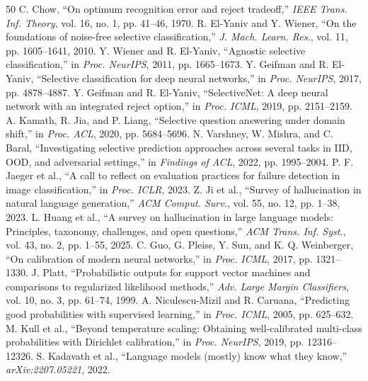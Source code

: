\documentclass[10pt,conference]{IEEEtran}
\begin{document}
\balance
\begin{thebibliography}{50}
 C. Chow, ``On optimum recognition error and reject tradeoff,'' \emph{IEEE Trans. Inf. Theory}, vol. 16, no. 1, pp. 41--46, 1970.
 R. El-Yaniv and Y. Wiener, ``On the foundations of noise-free selective classification,'' \emph{J. Mach. Learn. Res.}, vol. 11, pp. 1605--1641, 2010.
 Y. Wiener and R. El-Yaniv, ``Agnostic selective classification,'' in \emph{Proc. NeurIPS}, 2011, pp. 1665--1673.
 Y. Geifman and R. El-Yaniv, ``Selective classification for deep neural networks,'' in \emph{Proc. NeurIPS}, 2017, pp. 4878--4887.
 Y. Geifman and R. El-Yaniv, ``SelectiveNet: A deep neural network with an integrated reject option,'' in \emph{Proc. ICML}, 2019, pp. 2151--2159.
 A. Kamath, R. Jia, and P. Liang, ``Selective question answering under domain shift,'' in \emph{Proc. ACL}, 2020, pp. 5684--5696.
 N. Varshney, W. Mishra, and C. Baral, ``Investigating selective prediction approaches across several tasks in IID, OOD, and adversarial settings,'' in \emph{Findings of ACL}, 2022, pp. 1995--2004.
 P. F. Jaeger et al., ``A call to reflect on evaluation practices for failure detection in image classification,'' in \emph{Proc. ICLR}, 2023.
 Z. Ji et al., ``Survey of hallucination in natural language generation,'' \emph{ACM Comput. Surv.}, vol. 55, no. 12, pp. 1--38, 2023.
 L. Huang et al., ``A survey on hallucination in large language models: Principles, taxonomy, challenges, and open questions,'' \emph{ACM Trans. Inf. Syst.}, vol. 43, no. 2, pp. 1--55, 2025.
 C. Guo, G. Pleiss, Y. Sun, and K. Q. Weinberger, ``On calibration of modern neural networks,'' in \emph{Proc. ICML}, 2017, pp. 1321--1330.
 J. Platt, ``Probabilistic outputs for support vector machines and comparisons to regularized likelihood methods,'' \emph{Adv. Large Margin Classifiers}, vol. 10, no. 3, pp. 61--74, 1999.
 A. Niculescu-Mizil and R. Caruana, ``Predicting good probabilities with supervised learning,'' in \emph{Proc. ICML}, 2005, pp. 625--632.
 M. Kull et al., ``Beyond temperature scaling: Obtaining well-calibrated multi-class probabilities with Dirichlet calibration,'' in \emph{Proc. NeurIPS}, 2019, pp. 12316--12326.
 S. Kadavath et al., ``Language models (mostly) know what they know,'' \emph{arXiv:2207.05221}, 2022.

\end{thebibliography}
\end{document}
